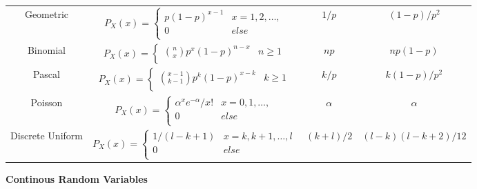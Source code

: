 \documentclass[8pt]{article}
\begin{document}
\begin{itemize}
\begin{tabular}{|c|c|c|c|}
        Geometric & $P_X(x) = \begin{cases}
            p (1 - p)^{x - 1} & x = 1, 2, \ldots, \\
            0 & else \\
        \end{cases}$ & $1/p$ & $(1 - p)/p^2$ \\
        Binomial & $P_X(x) = \begin{cases}
            {n \choose x} p^x (1 - p)^{n - x} & n \geq 1 \\
        \end{cases}$ & $np$ & $np(1 - p)$ \\
        Pascal & $P_X(x) = \begin{cases}
            {x - 1 \choose k - 1} p^k (1 - p)^{x - k} & k \geq 1 \\
        \end{cases}$ & $k/p$ & $k(1 - p)/p^2$ \\
        Poisson & $P_X(x) = \begin{cases}
            \alpha^x e^{-\alpha}/x! & x = 0, 1, \ldots, \\
            0 & else \\
        \end{cases}$ & $\alpha$ & $\alpha$ \\
        Discrete Uniform & $P_X(x) = \begin{cases}
            1/(l - k + 1) & x  = k, k + 1, \ldots, l \\
            0 & else \\
        \end{cases}$ & $(k + l)/2$ & $(l - k)(l - k + 2)/12$ \\
        \hline
    \end{tabular}
\end{itemize}
\textbf{Continous Random Variables}
\end{document}
